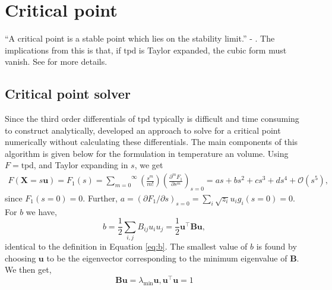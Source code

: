 \documentclass[internal,english]{sintefmemo2012}
\newcommand{\tpd}{\ensuremath{\text{tpd}}\xspace}
\begin{document}
\section{Critical point}
``A critical point is a stable point which lies on the stability
limit.'' - \citet{Heidemann1980}. The implications from this is that,
if \tpd is Taylor expanded, the cubic form must vanish. See
\cite{Heidemann1980} for more details.


\subsection{Critical point solver}
Since the third order differentials of \tpd typically is difficult and
time consuming to construct analytically, \citet{Michelsen1984}
developed an approach to solve for a critical point numerically
without calculating these differentials. The main components of this
algorithm is given below for the formulation in temperature an volume.
Using $F = \tpd$, and Taylor expanding in $s$, we get
\begin{align}
F(\mathbf{X} = s\mathbf{u}) = F_1(s) = \overset{\infty}{\underset{m=0}{\sum}}\left(\frac{s^m}{m!}\right)\left(\frac{\partial^m F_1}{\partial s^m}\right)_{s=0} = as + bs^2 + cs^3 + ds^4 + \mathcal{O}(s^5),
\label{eq:sTaylor}
\end{align}
since $F_1(s=0) = 0$. Further,
$a = \left(\partial F_1/\partial s\right)_{s=0} =
\underset{i}{\sum}\sqrt{z_i}u_ig_i(s=0)=0$. For $b$ we have,
\begin{equation}
b = \frac{1}{2}{\underset{i,j}{\sum}}B_{ij}u_iu_j = \frac{1}{2}\mathbf{u}^\intercal \mathbf{B} \mathbf{u},
\label{eq:bdef}
\end{equation}
identical to the definition in Equation \ref{eq:b}. The smallest value
of $b$ is found by choosing $\mathbf{u}$ to be the eigenvector
corresponding to the minimum eigenvalue of $\mathbf{B}$. We then get,
\begin{equation}
\mathbf{B} \mathbf{u} = \lambda_{\text{min}} \mathbf{u}, \mathbf{u}^\intercal\mathbf{u} = 1
\label{eq:brelation}
\end{equation}
\end{document}
